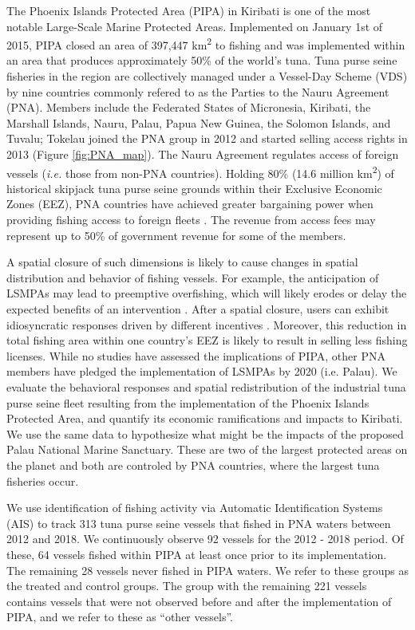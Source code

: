 \documentclass[9p,twocolumn,twoside,lineno]{pnas-new}
\begin{document}
The Phoenix Islands Protected Area (PIPA) in Kiribati is one of the most notable Large-Scale Marine Protected Areas. Implemented on January 1st of 2015, PIPA closed an area of 397,447 km\textsuperscript{2} to fishing and was implemented within an area that produces approximately 50\% of the world's tuna. Tuna purse seine fisheries in the region are collectively managed under a Vessel-Day Scheme (VDS) by nine countries commonly refered to as the Parties to the Nauru Agreement (PNA). Members include the Federated States of Micronesia, Kiribati, the Marshall Islands, Nauru, Palau, Papua New Guinea, the Solomon Islands, and Tuvalu; Tokelau joined the PNA group in 2012 and started selling access rights in 2013 (Figure \ref{fig:PNA_map}). The Nauru Agreement regulates access of foreign vessels (\emph{i.e.} those from non-PNA countries). Holding 80\% (14.6 million km\textsuperscript{2}) of historical skipjack tuna purse seine grounds within their Exclusive Economic Zones (EEZ), PNA countries have achieved greater bargaining power when providing fishing access to foreign fleets \cite{havice_2010}. The revenue from access fees may represent up to 50\% of government revenue for some of the members.

A spatial closure of such dimensions is likely to cause changes in spatial distribution and behavior of fishing vessels. For example, the anticipation of LSMPAs may lead to preemptive overfishing, which will likely erodes or delay the expected benefits of an intervention \cite{mcdermott_2018,hanich2018unraveling}. After a spatial closure, users can exhibit idiosyncratic responses driven by different incentives \cite{cabral_2017}. Moreover, this reduction in total fishing area within one country's EEZ is likely to result in selling less fishing licenses. While no studies have assessed the implications of PIPA, other PNA members have pledged the implementation of LSMPAs by 2020 (i.e. Palau). We evaluate the behavioral responses and spatial redistribution of the industrial tuna purse seine fleet resulting from the implementation of the Phoenix Islands Protected Area, and quantify its economic ramifications and impacts to Kiribati. We use the same data to hypothesize what might be the impacts of the proposed Palau National Marine Sanctuary. These are two of the largest protected areas on the planet and both are controled by PNA countries, where the largest tuna fisheries occur.

We use identification of fishing activity via Automatic Identification Systems (AIS) to track 313 tuna purse seine vessels that fished in PNA waters between 2012 and 2018. We continuously observe 92 vessels for the 2012 - 2018 period. Of these, 64 vessels fished within PIPA at least once prior to its implementation. The remaining 28 vessels never fished in PIPA waters. We refer to these groups as the treated and control groups. The group with the remaining 221 vessels contains vessels that were not observed before and after the implementation of PIPA, and we refer to these as ``other vessels''.
\end{document}
